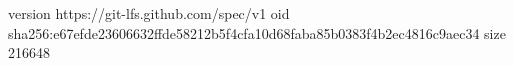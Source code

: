 version https://git-lfs.github.com/spec/v1
oid sha256:e67efde23606632ffde58212b5f4cfa10d68faba85b0383f4b2ec4816c9aec34
size 216648

